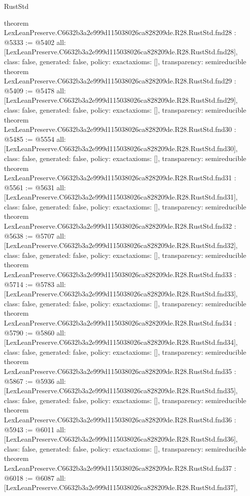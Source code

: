 \begin{lexlean}{RustStd}
\begin{coremodule}
{}
theorem LexLeanPreserve.C6632b3a2e999d115038026ca828209de.R28.RustStd.fnd28 : @5333 := @5402 {
  all: [LexLeanPreserve.C6632b3a2e999d115038026ca828209de.R28.RustStd.fnd28],
  class: false,
  generated: false,
  policy: exact{axioms: []},
  transparency: semireducible
}
theorem LexLeanPreserve.C6632b3a2e999d115038026ca828209de.R28.RustStd.fnd29 : @5409 := @5478 {
  all: [LexLeanPreserve.C6632b3a2e999d115038026ca828209de.R28.RustStd.fnd29],
  class: false,
  generated: false,
  policy: exact{axioms: []},
  transparency: semireducible
}
theorem LexLeanPreserve.C6632b3a2e999d115038026ca828209de.R28.RustStd.fnd30 : @5485 := @5554 {
  all: [LexLeanPreserve.C6632b3a2e999d115038026ca828209de.R28.RustStd.fnd30],
  class: false,
  generated: false,
  policy: exact{axioms: []},
  transparency: semireducible
}
theorem LexLeanPreserve.C6632b3a2e999d115038026ca828209de.R28.RustStd.fnd31 : @5561 := @5631 {
  all: [LexLeanPreserve.C6632b3a2e999d115038026ca828209de.R28.RustStd.fnd31],
  class: false,
  generated: false,
  policy: exact{axioms: []},
  transparency: semireducible
}
theorem LexLeanPreserve.C6632b3a2e999d115038026ca828209de.R28.RustStd.fnd32 : @5638 := @5707 {
  all: [LexLeanPreserve.C6632b3a2e999d115038026ca828209de.R28.RustStd.fnd32],
  class: false,
  generated: false,
  policy: exact{axioms: []},
  transparency: semireducible
}
theorem LexLeanPreserve.C6632b3a2e999d115038026ca828209de.R28.RustStd.fnd33 : @5714 := @5783 {
  all: [LexLeanPreserve.C6632b3a2e999d115038026ca828209de.R28.RustStd.fnd33],
  class: false,
  generated: false,
  policy: exact{axioms: []},
  transparency: semireducible
}
theorem LexLeanPreserve.C6632b3a2e999d115038026ca828209de.R28.RustStd.fnd34 : @5790 := @5860 {
  all: [LexLeanPreserve.C6632b3a2e999d115038026ca828209de.R28.RustStd.fnd34],
  class: false,
  generated: false,
  policy: exact{axioms: []},
  transparency: semireducible
}
theorem LexLeanPreserve.C6632b3a2e999d115038026ca828209de.R28.RustStd.fnd35 : @5867 := @5936 {
  all: [LexLeanPreserve.C6632b3a2e999d115038026ca828209de.R28.RustStd.fnd35],
  class: false,
  generated: false,
  policy: exact{axioms: []},
  transparency: semireducible
}
theorem LexLeanPreserve.C6632b3a2e999d115038026ca828209de.R28.RustStd.fnd36 : @5943 := @6011 {
  all: [LexLeanPreserve.C6632b3a2e999d115038026ca828209de.R28.RustStd.fnd36],
  class: false,
  generated: false,
  policy: exact{axioms: []},
  transparency: semireducible
}
theorem LexLeanPreserve.C6632b3a2e999d115038026ca828209de.R28.RustStd.fnd37 : @6018 := @6087 {
  all: [LexLeanPreserve.C6632b3a2e999d115038026ca828209de.R28.RustStd.fnd37],
}
\end{coremodule}
\end{lexlean}
